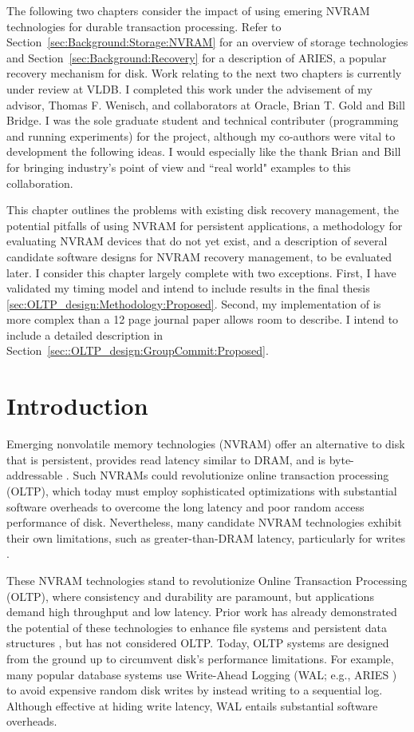 The following two chapters consider the impact of using emering NVRAM technologies for durable transaction processing.
Refer to Section~\ref{sec:Background:Storage:NVRAM} for an overview of storage technologies and Section~\ref{sec:Background:Recovery} for a description of ARIES, a popular recovery mechanism for disk.
Work relating to the next two chapters is currently under review at VLDB.
I completed this work under the advisement of my advisor, Thomas F. Wenisch, and collaborators at Oracle, Brian T. Gold and Bill Bridge.
I was the sole graduate student and technical contributer (programming and running experiments) for the project, although my co-authors were vital to development the following ideas.
I would especially like the thank Brian and Bill for bringing industry's point of view and ``real world" examples to this collaboration.

This chapter outlines the problems with existing disk recovery management, the potential pitfalls of using NVRAM for persistent applications, a methodology for evaluating NVRAM devices that do not yet exist, and a description of several candidate software designs for NVRAM recovery management, to be evaluated later.
I consider this chapter largely complete with two exceptions.
First, I have validated my timing model and intend to include results in the final thesis \ref{sec:OLTP_design:Methodology:Proposed}.
Second, my implementation of \GroupCommit is more complex than a 12 page journal paper allows room to describe.
I intend to include a detailed description in Section~\ref{sec::OLTP_design:GroupCommit:Proposed}.

\section{Introduction}
\label{sec:OLTP_design:Intro}

Emerging nonvolatile memory technologies (NVRAM) offer an alternative to disk that is persistent, provides read latency similar to DRAM, and is byte-addressable \cite{BurrKurdi08}.
Such NVRAMs could revolutionize online transaction processing (OLTP), which today must employ sophisticated optimizations with substantial software overheads to overcome the long latency and poor random access performance of disk.
Nevertheless, many candidate NVRAM technologies exhibit their own limitations, such as greater-than-DRAM latency, particularly for writes \cite{LeeIpek09}.

These NVRAM technologies stand to revolutionize Online Transaction Processing (OLTP), where consistency and durability are paramount, but applications demand high throughput and low latency.
Prior work has already demonstrated the potential of these technologies to enhance file systems \cite{GreenanMiller06, ConditNightingale09} and persistent data structures \cite{VenkataramanTolia11}, but has not considered OLTP. 
Today, OLTP systems are designed from the ground up to circumvent disk's performance limitations.
For example, many popular database systems use Write-Ahead Logging (WAL; e.g., ARIES \cite{MohanHaderle92}) to avoid expensive random disk writes by instead writing to a sequential log.  
Although effective at hiding write latency, WAL entails substantial software overheads.

